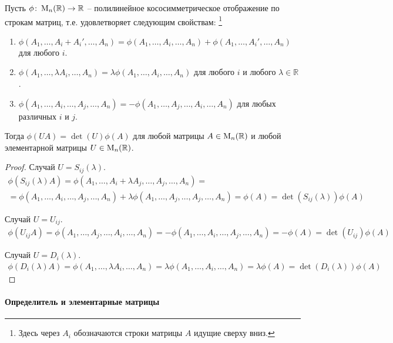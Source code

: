 \begin{claim}\label{claim::PolyAntiAndElementary}
Пусть $\phi\colon \operatorname{M}_{n}(\mathbb R)\to \mathbb R$ -- полилинейное кососимметрическое отображение по строкам матриц, т.е. удовлетворяет следующим свойствам:%
\footnote{Здесь через $A_i$ обозначаются строки матрицы $A$ идущие сверху вниз.}
\begin{enumerate}
\item $\phi(A_1,\ldots, A_i + A_i', \ldots, A_n) = \phi(A_1,\ldots, A_i, \ldots, A_n) + \phi(A_1,\ldots,A_i', \ldots, A_n)$ для любого $i$.

\item $\phi(A_1,\ldots, \lambda A_i, \ldots, A_n) = \lambda \phi(A_1,\ldots, A_i, \ldots, A_n)$ для любого $i$ и любого $\lambda\in\mathbb R$.

\item $\phi(A_1,\ldots, A_i, \ldots, A_j, \ldots, A_n) = -\phi(A_1,\ldots, A_j, \ldots, A_i, \ldots, A_n)$ для любых различных $i$ и $j$.
\end{enumerate}
Тогда $\phi(UA) = \det(U)\phi(A)$ для любой матрицы $A\in\operatorname{M}_{n}(\mathbb R)$ и любой элементарной матрицы $U\in\operatorname{M}_{n}(\mathbb R)$.
\end{claim}
\begin{proof}
Случай $U = S_{ij}(\lambda)$.
\begin{gather*}
\phi(S_{ij}(\lambda)A) = \phi(A_1,\ldots, A_i + \lambda A_j, \ldots, A_j, \ldots, A_n) = \\
= \phi(A_1,\ldots, A_i, \ldots, A_j, \ldots, A_n) + \lambda\phi(A_1,\ldots, A_j, \ldots, A_j, \ldots, A_n) =  \phi(A) = \det(S_{ij}(\lambda))\phi(A)
\end{gather*}

Случай $U= U_{ij}$.
\begin{gather*}
\phi(U_{ij}A) = \phi(A_1,\ldots, A_j, \ldots, A_i, \ldots, A_n) = -\phi(A_1,\ldots, A_i, \ldots, A_j, \ldots, A_n) = -\phi(A) = \det(U_{ij})\phi(A)
\end{gather*}

Случай $U=D_i(\lambda)$.
\begin{gather*}
\phi(D_i(\lambda)A) = \phi(A_1,\ldots,\lambda A_i,\ldots, A_n) = \lambda \phi(A_1,\ldots, A_i,\ldots, A_n) = \lambda \phi(A) = \det(D_i(\lambda))\phi(A)
\end{gather*}
\end{proof}

\paragraph{Определитель и элементарные матрицы}

